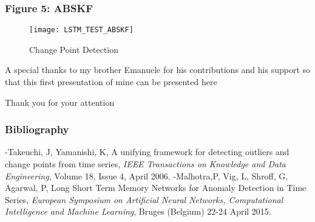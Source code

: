 \documentclass[aspectratio=1610]{beamer}
\begin{document}
\begin{frame}
	\frametitle{Figure 5: ABSKF}
	\begin{figure}[!h]
		\centering
		{\texttt{[image: LSTM\_TEST\_ABSKF]}}
		\caption{Change Point Detection \label{t1v2}}
	\end{figure}	
\end{frame}
\begin{frame}
	\centering
	\begin{LARGE}
	A special thanks to my brother Emanuele for his contributions and his support so that this first presentation of mine can be presented here
	\end{LARGE}
\end{frame}
\begin{frame}
	\centering
	\begin{Huge}
		Thank you for your attention
	\end{Huge}
\end{frame}
\begin{frame}
	\frametitle{Bibliography}
	\begin{thebibliography}{References}
		\bibitem-Takeuchi, J, Yamanishi, K, A unifying framework for detecting outliers and change points from time series, \textit{IEEE Transactions on Knowledge and Data Engineering}, Volume 18, Issue 4, April 2006.
		\bibitem-Malhotra,P, Vig, L, Shroff, G, Agarwal, P, Long Short Term Memory Networks for Anomaly Detection in Time Series, \textit{European Symposium on Artificial Neural Networks, Computational Intelligence
			and Machine Learning}, Bruges (Belgium) 22-24 April 2015.
		
	\end{thebibliography}
\end{frame}
\end{document}
